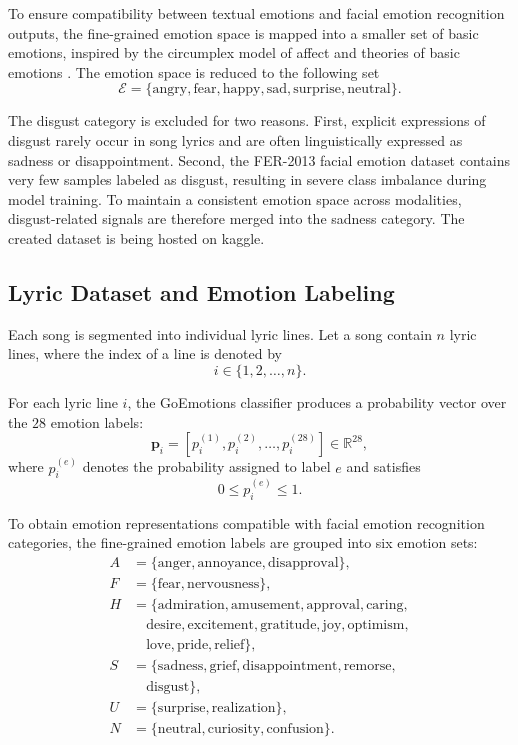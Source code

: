 \documentclass[11pt]{article}
\begin{document}
To ensure compatibility between textual emotions and facial emotion recognition outputs, the fine-grained emotion space is mapped into a smaller set of basic emotions, inspired by the circumplex model of affect and theories of basic emotions \cite{russell1980circumplex, ekman1992argument}. The emotion space is reduced to the following set
\[
\mathcal{E} =
\{\text{angry}, \text{fear}, \text{happy}, \text{sad}, \text{surprise}, \text{neutral}\}.
\]

The disgust category is excluded for two reasons. First, explicit expressions of disgust rarely occur in song lyrics and are often linguistically expressed as sadness or disappointment. Second, the FER-2013 facial emotion dataset contains very few samples labeled as disgust, resulting in severe class imbalance during model training. To maintain a consistent emotion space across modalities, disgust-related signals are therefore merged into the sadness category.
The created dataset is being hosted on kaggle\cite{author2025}.


\subsection{Lyric Dataset and Emotion Labeling}
Each song is segmented into individual lyric lines. Let a song contain $n$ lyric lines, where the index of a line is denoted by
\[
i \in \{1,2,\dots,n\}.
\]


For each lyric line $i$, the GoEmotions classifier produces a probability vector over the $28$ emotion labels:
\[
\mathbf{p}_i =
\left[
p_i^{(1)}, p_i^{(2)}, \dots, p_i^{(28)}
\right] \in \mathbb{R}^{28},
\]
where $p_i^{(e)}$ denotes the probability assigned to label $e$ and satisfies
\[
0 \le p_i^{(e)} \le 1.
\]

To obtain emotion representations compatible with facial emotion recognition categories, the fine-grained emotion labels are grouped into six emotion sets:
\[
\begin{aligned}
A &= \{\text{anger}, \text{annoyance}, \text{disapproval}\}, \\
F &= \{\text{fear}, \text{nervousness}\}, \\
H &= \{\text{admiration}, \text{amusement}, \text{approval}, \text{caring}, \\
  &\quad \text{desire}, \text{excitement}, \text{gratitude}, \text{joy}, \text{optimism}, \\
  &\quad \text{love}, \text{pride}, \text{relief}\}, \\
S &= \{\text{sadness}, \text{grief}, \text{disappointment}, \text{remorse}, \\
  &\quad \text{disgust}\}, \\
U &= \{\text{surprise}, \text{realization}\}, \\
N &= \{\text{neutral}, \text{curiosity}, \text{confusion}\}.
\end{aligned}
\]
\end{document}
